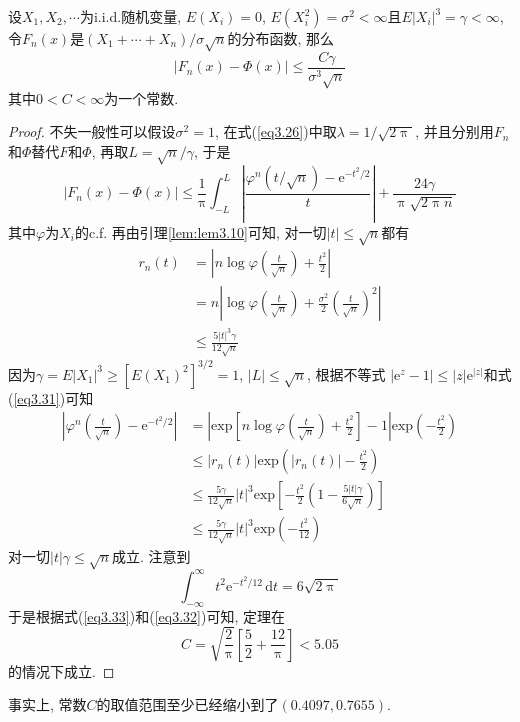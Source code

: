 \documentclass[cn, 12pt, math=mtpro2, bibstyle=apa, blue, twocol]{elegantbook}
\begin{document}
\begin{theorem}
  设$X_1,X_2,\cdots$为i.i.d.随机变量, $E(X_i)=0$, $E(X_i^2)=\sigma^2<\infty$且$E|X_i|^3=\gamma<\infty$, 令$F_n(x)$是$(X_1+\cdots+X_n)/\sigma\sqrt{n}$的分布函数, 那么
  $$|F_n(x)-\Phi(x)|\leq\frac{C\gamma}{\sigma^3\sqrt{n}}$$
  其中$0<C<\infty$为一个常数.
\end{theorem}
\begin{proof}
不失一般性可以假设$\sigma^2=1$, 在式(\ref{eq3.26})中取$\lambda=1/\sqrt{2\uppi}$, 并且分别用$F_n$和$\Phi$替代$F$和$\Phi$, 再取$L=\sqrt{n}/\gamma$, 于是
\begin{equation}\label{eq3.33}
  |F_n(x)-\Phi(x)|\leq \frac{1}{\uppi}\int_{-L}^{L}\left|\frac{\varphi^n(t/\sqrt{n})-\text{e}^{-t^2/2}}{t}\right|+\frac{24\gamma}{\uppi\sqrt{2\uppi n}}
\end{equation}
其中$\varphi$为$X_i$的c.f. 再由引理\ref{lem:lem3.10}可知, 对一切$|t|\leq \sqrt{n}$都有
\begin{align}
r_n(t)&=\left|n\log\varphi\left(\frac{t}{\sqrt{n}}\right)+\frac{t^2}{2}\right| \nonumber \\
&=n\left|\log\varphi\left(\frac{t}{\sqrt{n}}\right)+\frac{\sigma^2}{2}\left(\frac{t}{\sqrt{n}}\right)^2 \right| \nonumber \\
&\leq \frac{5|t|^3\gamma}{12\sqrt{n}} \label{eq3.31}
\end{align}
因为$\gamma=E|X_1|^3\geq [E(X_1)^2]^{3/2}=1$, $|L|\leq \sqrt{n}$, 根据不等式
$|\text{e}^z-1|\leq |z|\text{e}^{|z|}$和式(\ref{eq3.31})可知
\begin{align}
\left|\varphi^n\left(\frac{t}{\sqrt{n}}\right)-\text{e}^{-t^2/2} \right|&=\left|\text{exp}\left[n\log\varphi\left(\frac{t}{\sqrt{n}}\right)+\frac{t^2}{2}\right]-1\right|\text{exp}\left(-\frac{t^2}{2}\right) \nonumber \\
&\leq |r_n(t)|\text{exp}\left(|r_n(t)|-\frac{t^2}{2}\right) \nonumber \\
&\leq \frac{5\gamma}{12\sqrt{n}}|t|^3\text{exp}\left[-\frac{t^2}{2}\left(1-\frac{5|t|\gamma}{6\sqrt{n}}\right)\right] \nonumber \\
&\leq \frac{5\gamma}{12\sqrt{n}}|t|^3\text{exp}\left(-\frac{t^2}{12}\right) \label{eq3.32}
\end{align}
对一切$|t|\gamma\leq \sqrt{n}$成立. 注意到
$$\int_{-\infty}^{\infty}t^2\text{e}^{-t^2/12}\,\text{d}t=6\sqrt{2\uppi}$$于是根据式(\ref{eq3.33})和(\ref{eq3.32})可知, 定理在
$$C=\sqrt{\frac{2}{\uppi}}\left[\frac{5}{2}+\frac{12}{\uppi}\right]<5.05$$
的情况下成立.
\end{proof}
\begin{remark}
事实上, 常数$C$的取值范围至少已经缩小到了$(0.4097,0.7655)$.
\end{remark}
\end{document}
